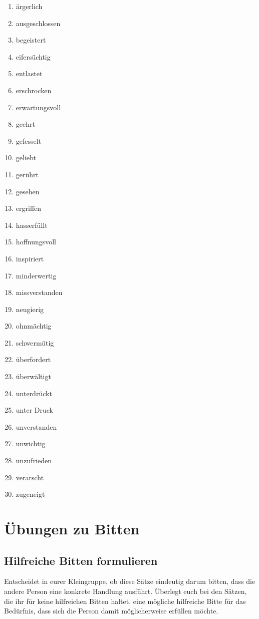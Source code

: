 \begin{enumerate}
  \item ärgerlich
  \item ausgeschlossen
  \item begeistert
  \item eifersüchtig
  \item entlastet
  \item erschrocken
  \item erwartungsvoll
  \item geehrt
  \item gefesselt
  \item geliebt
  \item gerührt
  \item gesehen
  \item ergriffen
  \item hasserfüllt
  \item hoffnungsvoll
  \item inspiriert
  \item minderwertig
  \item missverstanden
  \item neugierig
  \item ohnmächtig
  \item schwermütig
  \item überfordert
  \item überwältigt
  \item unterdrückt
  \item unter Druck
  \item unverstanden
  \item unwichtig
  \item unzufrieden
  \item verarscht
  \item zugeneigt
\end{enumerate}


\section{Übungen zu Bitten}


\subsection{Hilfreiche Bitten formulieren}

Entscheidet in eurer Kleingruppe, ob diese Sätze eindeutig darum bitten, dass die andere Person eine konkrete Handlung ausführt. Überlegt euch bei den Sätzen, die ihr für keine hilfreichen Bitten haltet, eine mögliche hilfreiche Bitte für das Bedürfnis, dass sich die Person damit möglicherweise erfüllen möchte.


